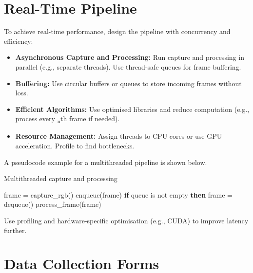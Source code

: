 \documentclass{article}
\begin{document}
    \section{Real-Time Pipeline}

    To achieve real-time performance, design the pipeline with concurrency and efficiency:
    \begin{itemize}
        \item \textbf{Asynchronous Capture and Processing:} Run capture and processing in parallel (e.g., separate threads). Use thread-safe queues for frame buffering.
        \item \textbf{Buffering:} Use circular buffers or queues to store incoming frames without loss.
        \item \textbf{Efficient Algorithms:} Use optimised libraries and reduce computation (e.g., process every \textsubscript{n}th frame if needed).
        \item \textbf{Resource Management:} Assign threads to CPU cores or use GPU acceleration. Profile to find bottlenecks.
    \end{itemize}
    A pseudocode example for a multithreaded pipeline is shown below.

    \begin{algorithm}
        \caption{Multithreaded capture and processing}
        \begin{algorithmic}[1]
            \STATE frame = capture\_rgb()
            \STATE enqueue(frame)
            \STATE \textbf{if} queue is not empty \textbf{then}
            \STATE \quad frame = dequeue()
            \STATE \quad process\_frame(frame)  
            \ENDWHILE
        \end{algorithmic}
    \end{algorithm}

    Use profiling and hardware-specific optimisation (e.g., CUDA) to improve latency further.


    \section{Data Collection Forms}
\end{document}
